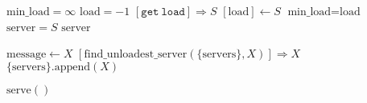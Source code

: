 \documentclass{article}
\begin{document}
\pagestyle{empty}

\newcommand{\send}{\Rightarrow}
\newcommand{\sendto}{\rightarrow}
\algrenewcommand\textproc{\textrm}

\begin{algorithmic}
  
  \algrenewcommand{}
  
  
  \State $\text{min\_load}=\infty$
  \State $\text{load} = -1$
  \Else
  \State $[\mathtt{get~load}] \send S$
  \State $[\text{load}] \gets S$
  \EndIf
  \State $\text{min\_load}=\text{load}$
  \State $\text{server}=S$
  \EndIf
  \EndFor
  \State \Return $\text{server}$
  \EndFunction

  \algrenewcommand{}

  \State $\text{message} \gets X$
  \State $[\text{find\_unloadest\_server}(\{\text{servers}\},X)] \send X$
  \Else
  \State $\{\text{servers}\}.\text{append}(X)$
  \EndIf
  \EndIf
  \EndWhile
  \EndProcedure

  \State $\text{serve}()$
  \EndFunction

  \EndProcedure
\end{algorithmic}
\end{document}
